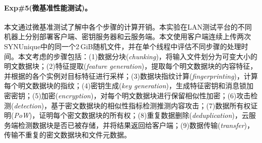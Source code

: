 \paragraph*{Exp\#5(微基准性能测试)。}
本文通过微基准测试了解\prototype 中各个步骤的计算开销。本实验在LAN测试平台的不同机器上分别部署客户端、密钥服务器和云服务端。本文使用客户端连续上传两次SYNUnique中的同一个2\,GiB随机文件，并在单个线程中评估不同步骤的处理时间。本文考虑的步骤包括：(1)数据分块(\textit{chunking})，将输入文件划分为可变大小的明文数据块；(2)特征提取(\textit{feature generation})，提取每个明文数据块的内容特征，并根据\sysnameF 的各个实例对目标特征进行采样；(3)数据块指纹计算(\textit{fingerprinting})，计算每个明文数据块的指纹；(4)密钥生成(\textit{key generation})，生成特征密钥和消息锁加密密钥；(5)加密(\textit{encryption})，对每个明文数据块进行保留相似性加密；(6)攻击检测(\textit{detection})，基于密文数据块的相似性指标检测推测内容攻击；(7)数据所有权证明(\textit{PoW})，证明每个密文数据块的所有权；(8)重复数据删除(\textit{deduplication})，云服务端检测数据块是否已被存储，并将结果返回给客户端；(9)数据传输(\textit{transfer})，传输不重复的密文数据块和文件元数据。

